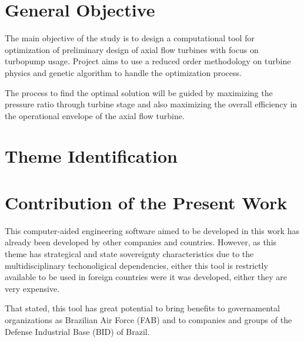 \section{General Objective}
The main objective of the study is to design a computational tool for optimization of preliminary design of axial flow turbines with focus on turbopump usage. Project aims to use a reduced order methodology on turbine physics and genetic algorithm to handle the optimization process.

The process to find the optimal solution will be guided by maximizing the pressure ratio through turbine stage and also maximizing the overall efficiency in the operational envelope of the axial flow turbine.  

\section{Theme Identification}

\section{Contribution of the Present Work}
This computer-aided engineering software aimed to be developed in this work has already been developed by other companies and countries. However, as this theme has strategical and state sovereignty characteristics due to the multidisciplinary techonoligical dependencies, either this tool is restrictly available to be used in foreign countries were it was developed, either they are very expensive.

That stated, this tool has great potential to bring benefits to governamental organizations as Brazilian Air Force (FAB) and to companies and groups of the Defense Industrial Base (BID) of Brazil.